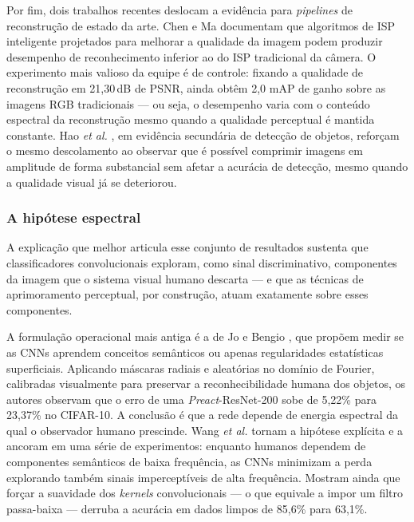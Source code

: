 \documentclass[conference]{IEEEtran}
\begin{document}
Por fim, dois trabalhos recentes deslocam a evidência para \textit{pipelines}
de reconstrução de estado da arte. Chen e Ma \cite{b12} documentam que
algoritmos de ISP inteligente projetados para melhorar a qualidade da imagem
podem produzir desempenho de reconhecimento inferior ao do ISP tradicional da
câmera. O experimento mais valioso da equipe é de controle: fixando a qualidade de
reconstrução em 21,30\,dB de PSNR, ainda obtêm 2,0 mAP de ganho sobre as
imagens RGB tradicionais --- ou seja, o desempenho varia com o conteúdo
espectral da reconstrução mesmo quando a qualidade perceptual é mantida
constante. Hao \textit{et al.} \cite{b13}, em evidência secundária de detecção
de objetos, reforçam o mesmo descolamento ao observar que é possível comprimir
imagens em amplitude de forma substancial sem afetar a acurácia de detecção,
mesmo quando a qualidade visual já se deteriorou.

\subsubsection{A hipótese espectral}

A explicação que melhor articula esse conjunto de resultados sustenta que
classificadores convolucionais exploram, como sinal discriminativo,
componentes da imagem que o sistema visual humano descarta --- e que as
técnicas de aprimoramento perceptual, por construção, atuam exatamente sobre
esses componentes.

A formulação operacional mais antiga é a de Jo e Bengio \cite{b14}, que propõem
medir se as CNNs aprendem conceitos semânticos ou apenas regularidades
estatísticas superficiais. Aplicando máscaras radiais e aleatórias no domínio
de Fourier, calibradas visualmente para preservar a reconhecibilidade humana
dos objetos, os autores observam que o erro de uma \textit{Preact}-ResNet-200
sobe de 5,22\% para 23,37\% no CIFAR-10. A conclusão é que a rede depende de
energia espectral da qual o observador humano prescinde. Wang \textit{et al.} \cite{b15} 
tornam a hipótese explícita e a ancoram em uma série de experimentos: 
enquanto humanos dependem de componentes semânticos de baixa frequência, as CNNs
minimizam a perda explorando também sinais imperceptíveis de alta frequência.
Mostram ainda que forçar a suavidade dos \textit{kernels} convolucionais 
--- o que equivale a impor um filtro passa-baixa --- derruba a acurácia em 
dados limpos de 85,6\% para 63,1\%.
\end{document}
